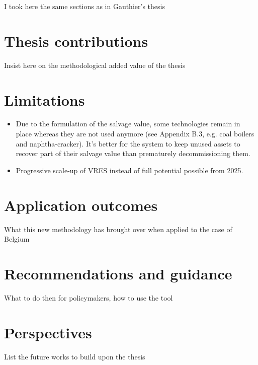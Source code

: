 I took here the same sections as in Gauthier's thesis
\section*{Thesis contributions}
Insist here on the methodological added value of the thesis

\section*{Limitations}
\begin{itemize}
\item Due to the formulation of the salvage value, some technologies remain in place whereas they are not used anymore (see Appendix B.3, e.g. coal boilers and naphtha-cracker). It's better for the system to keep unused assets to recover part of their salvage value than prematurely decommissioning them.
\item Progressive scale-up of \gls{VRES} instead of full potential possible from 2025.
\end{itemize}

\section*{Application outcomes}
What this new methodology has brought over when applied to the case of Belgium

\section*{Recommendations and guidance}
What to do then for policymakers, how to use the tool

\section*{Perspectives}
List the future works to build upon the thesis


